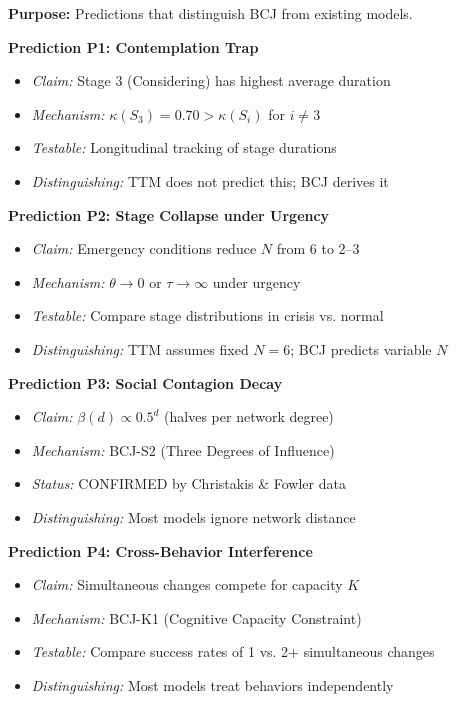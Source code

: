 \begin{tcolorbox}[colback=red!5!white, colframe=red!75!black,
    title=Validation V6: Novel Predictions]
\textbf{Purpose:} Predictions that distinguish BCJ from existing models.

\textbf{Prediction P1: Contemplation Trap}
\begin{itemize}[nosep]
\item \textit{Claim:} Stage 3 (Considering) has highest average duration
\item \textit{Mechanism:} $\kappa(S_3) = 0.70 > \kappa(S_i)$ for $i \neq 3$
\item \textit{Testable:} Longitudinal tracking of stage durations
\item \textit{Distinguishing:} TTM does not predict this; BCJ derives it
\end{itemize}

\textbf{Prediction P2: Stage Collapse under Urgency}
\begin{itemize}[nosep]
\item \textit{Claim:} Emergency conditions reduce $N$ from 6 to 2--3
\item \textit{Mechanism:} $\theta \to 0$ or $\tau \to \infty$ under urgency
\item \textit{Testable:} Compare stage distributions in crisis vs. normal
\item \textit{Distinguishing:} TTM assumes fixed $N=6$; BCJ predicts variable $N$
\end{itemize}

\textbf{Prediction P3: Social Contagion Decay}
\begin{itemize}[nosep]
\item \textit{Claim:} $\beta(d) \propto 0.5^d$ (halves per network degree)
\item \textit{Mechanism:} BCJ-S2 (Three Degrees of Influence)
\item \textit{Status:} CONFIRMED by Christakis \& Fowler data
\item \textit{Distinguishing:} Most models ignore network distance
\end{itemize}

\textbf{Prediction P4: Cross-Behavior Interference}
\begin{itemize}[nosep]
\item \textit{Claim:} Simultaneous changes compete for capacity $K$
\item \textit{Mechanism:} BCJ-K1 (Cognitive Capacity Constraint)
\item \textit{Testable:} Compare success rates of 1 vs. 2+ simultaneous changes
\item \textit{Distinguishing:} Most models treat behaviors independently
\end{itemize}


\end{tcolorbox}
